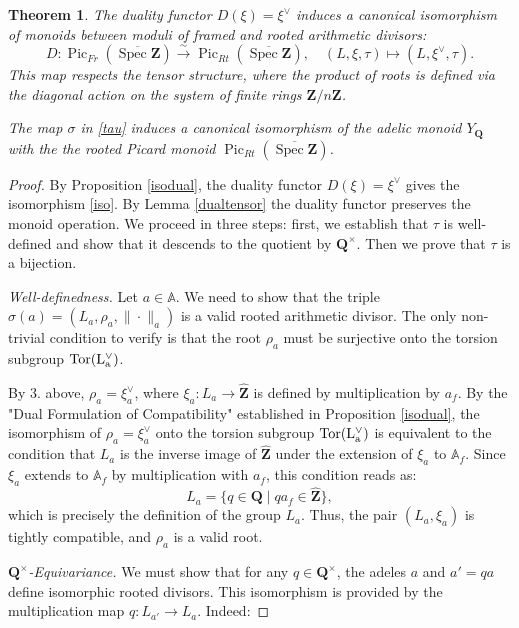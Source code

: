 \documentclass[11pt,a4paper]{article}
\newcommand{\Q}{\mathbf{Q}}
\newcommand{\Z}{\mathbf{Z}}
\newcommand{\A}{\mathbb{A}}
\newcommand{\Af}{\mathbb{A}_f}
\def\spzb{\overline{\Spec \Z}}
\newcommand{\Spec}{\operatorname{Spec}}
\def\MFr{\operatorname{Pic}_{Fr}}
\def\MRt{\operatorname{Pic}_{Rt}}
\theoremstyle{plain}
\newtheorem{thm}{Theorem}[section]
\theoremstyle{definition} %
\begin{document}
\begin{thm}\label{unif}
The duality functor $D(\xi) = \xi^\vee$ induces a canonical isomorphism of monoids between moduli of framed and rooted arithmetic divisors:
\begin{equation}\label{iso}
D: \MFr(\spzb) \xrightarrow{\sim} \MRt(\spzb), \quad (L, \xi, \tau) \longmapsto (L, \xi^\vee, \tau).
\end{equation}
This map respects the tensor structure, where the product of roots is defined via the diagonal action on the system of finite rings $\Z/n\Z$.

The map $\sigma$ in \eqref{tau} induces  a canonical isomorphism of the adelic monoid  $Y_\Q$ with the the rooted Picard monoid $\MRt(\spzb)$.
\end{thm}
\begin{proof}
By Proposition \ref{isodual},  the duality functor $D(\xi) = \xi^\vee$ gives the isomorphism \eqref{iso}.  By  Lemma \ref{dualtensor} the duality functor  preserves the monoid operation. 
\iffalse We proceed in three steps: first, we establish that $\tau$ is well-defined and show that it descends to the quotient by $\Q^\times$. Then we prove  that $\tau$ is a bijection.\vspace{.03in}

\emph{Well-definedness.} 
Let $a \in \A$. We need to show that the triple $\sigma(a) = (L_a, \rho_a, \|\cdot\|_a)$ is a valid rooted arithmetic divisor. The only non-trivial condition to verify is that the root $\rho_a$ must be surjective onto the torsion subgroup $\rm{Tor}(L_a^\vee)$.

By $3.$ above, $\rho_a = \xi_a^\vee$, where $\xi_a: L_a \to \widehat{\Z}$ is defined by multiplication by $a_f$.
By the "Dual Formulation of Compatibility" established in  Proposition \ref{isodual}, the isomorphism of $\rho_a=\xi_a^\vee$ onto the torsion subgroup $\rm{Tor}(L_a^\vee)$ is equivalent to the condition that $L_a$ is the inverse image of $\widehat{\Z}$ under the extension of $\xi_a$ to $\Af$.
Since $\xi_a$ extends to $\Af$ by multiplication with $a_f$, this condition reads as:
\[
L_a = \{ q \in \Q \mid q a_f \in \widehat{\Z} \},
\]
which is precisely the definition of the group $L_a$. Thus, the pair $(L_a, \xi_a)$ is tightly compatible, and $\rho_a$ is a valid root.\vspace{.03in}

\emph{$\Q^\times$-Equivariance.}
 We must show that for any $q \in \Q^\times$, the adeles $a$ and $a' = qa$ define isomorphic rooted divisors.
This isomorphism is provided by the multiplication map $q: L_{a'} \to L_a$. Indeed:\vspace{.03in}


\end{proof}
\end{document}
